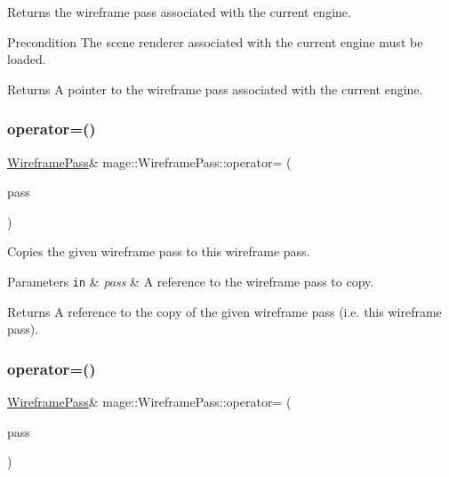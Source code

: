 Returns the wireframe pass associated with the current engine.

\begin{DoxyPrecond}{Precondition}
The scene renderer associated with the current engine must be loaded. 
\end{DoxyPrecond}
\begin{DoxyReturn}{Returns}
A pointer to the wireframe pass associated with the current engine. 
\end{DoxyReturn}
\hypertarget{classmage_1_1_wireframe_pass_a05d891aae7dae2e222f94fe495651615}{}\label{classmage_1_1_wireframe_pass_a05d891aae7dae2e222f94fe495651615} 
\subsubsection{\texorpdfstring{operator=()}{operator=()}\hspace{0.1cm}{\footnotesize\ttfamily [1/2]}}
{\footnotesize\ttfamily \hyperlink{classmage_1_1_wireframe_pass}{Wireframe\+Pass}\& mage\+::\+Wireframe\+Pass\+::operator= (\begin{DoxyParamCaption}\item[{const \hyperlink{classmage_1_1_wireframe_pass}{Wireframe\+Pass} \&}]{pass }\end{DoxyParamCaption})\hspace{0.3cm}{\ttfamily [delete]}}

Copies the given wireframe pass to this wireframe pass.


\begin{DoxyParams}[1]{Parameters}
\mbox{\tt in}  & {\em pass} & A reference to the wireframe pass to copy. \\
\hline
\end{DoxyParams}
\begin{DoxyReturn}{Returns}
A reference to the copy of the given wireframe pass (i.\+e. this wireframe pass). 
\end{DoxyReturn}
\hypertarget{classmage_1_1_wireframe_pass_a62a5a2a49a9e8abcedc864dda0c43162}{}\label{classmage_1_1_wireframe_pass_a62a5a2a49a9e8abcedc864dda0c43162} 
\subsubsection{\texorpdfstring{operator=()}{operator=()}\hspace{0.1cm}{\footnotesize\ttfamily [2/2]}}
{\footnotesize\ttfamily \hyperlink{classmage_1_1_wireframe_pass}{Wireframe\+Pass}\& mage\+::\+Wireframe\+Pass\+::operator= (\begin{DoxyParamCaption}\item[{\hyperlink{classmage_1_1_wireframe_pass}{Wireframe\+Pass} \&\&}]{pass }\end{DoxyParamCaption})\hspace{0.3cm}{\ttfamily [delete]}}


